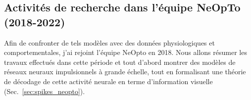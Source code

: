 


\subsection{Activités de recherche dans l'équipe NeOpTo (2018-2022)}
\label{sec:neopto}

Afin de confronter de tels modèles avec des données physiologiques et comportementales, j'ai rejoint l'équipe NeOpto en 2018. Nous allons résumer les travaux effectués dans cette période et tout d'abord montrer des modèles de réseaux neuraux impulsionnels à grande échelle, tout en formalisant une théorie de décodage de cette activité neurale en terme d'information visuelle (Sec.~\ref{sec:spikes_neopto}).

